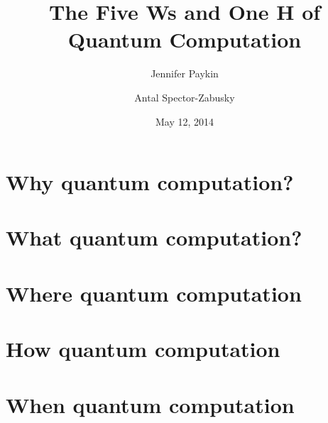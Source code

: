 \documentclass[12pt]{amsart}
\title{The Five Ws and One H of Quantum Computation}
\author{Jennifer Paykin \and Antal Spector-Zabusky}
\date{May 12, 2014}
\begin{document}
\maketitle

\section{Why quantum computation?}\label{sec:why}


\section{What quantum computation?}\label{sec:what}


\section{Where quantum computation}\label{sec:where}


\section{How quantum computation}\label{sec:how}


\section{When quantum computation}\label{sec:when}


\def\refname{Who quantum computation}


\end{document}

